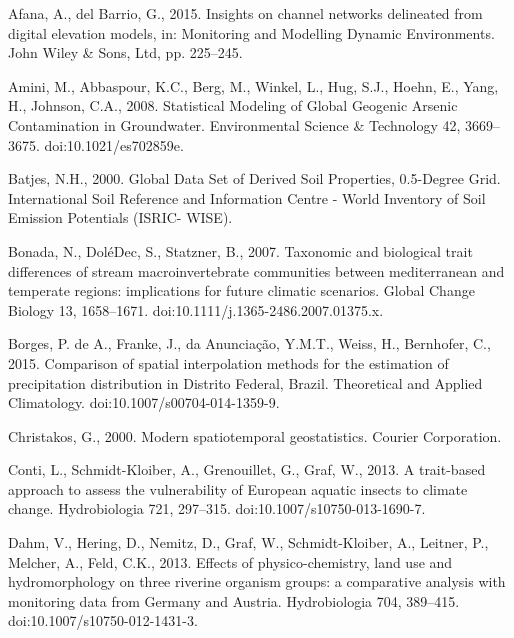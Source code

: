 \openleft

\begingroup

\renewcommand{\addcontentsline}[3]{}

\begin{thebibliography}

\bibitem{} \hangindent=1cm Afana, A., del Barrio, G., 2015. Insights on channel networks delineated from digital elevation models, in: Monitoring and Modelling Dynamic Environments. John Wiley & Sons, Ltd, pp. 225–245.

\bibitem{} \hangindent=1cm Amini, M., Abbaspour, K.C., Berg, M., Winkel, L., Hug, S.J., Hoehn, E., Yang, H., Johnson, C.A., 2008. Statistical Modeling of Global Geogenic Arsenic Contamination in Groundwater. Environmental Science & Technology 42, 3669–3675. doi:10.1021/es702859e.

\bibitem{} \hangindent=1cm Batjes, N.H., 2000. Global Data Set of Derived Soil Properties, 0.5-Degree Grid. International Soil Reference and Information Centre - World Inventory of Soil Emission Potentials (ISRIC- WISE).

\bibitem{} \hangindent=1cm Bonada, N., DoléDec, S., Statzner, B., 2007. Taxonomic and biological trait differences of stream macroinvertebrate communities between mediterranean and temperate regions: implications for future climatic scenarios. Global Change Biology 13, 1658–1671. doi:10.1111/j.1365-2486.2007.01375.x.

\bibitem{} \hangindent=1cm Borges, P. de A., Franke, J., da Anunciação, Y.M.T., Weiss, H., Bernhofer, C., 2015. Comparison of spatial interpolation methods for the estimation of precipitation distribution in Distrito Federal, Brazil. Theoretical and Applied Climatology. doi:10.1007/s00704-014-1359-9.

\bibitem{} \hangindent=1cm Christakos, G., 2000. Modern spatiotemporal geostatistics. Courier Corporation.

\bibitem{} \hangindent=1cm Conti, L., Schmidt-Kloiber, A., Grenouillet, G., Graf, W., 2013. A trait-based approach to assess the vulnerability of European aquatic insects to climate change. Hydrobiologia 721, 297–315. doi:10.1007/s10750-013-1690-7.

\bibitem{} \hangindent=1cm Dahm, V., Hering, D., Nemitz, D., Graf, W., Schmidt-Kloiber, A., Leitner, P., Melcher, A., Feld, C.K., 2013. Effects of physico-chemistry, land use and hydromorphology on three riverine organism groups: a comparative analysis with monitoring data from Germany and Austria. Hydrobiologia 704, 389–415. doi:10.1007/s10750-012-1431-3.


\end{thebibliography}
